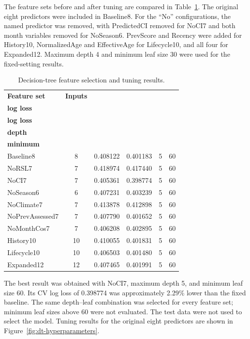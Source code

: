 \documentclass[NewProceedings,letterpaper,NoPageNumbers,NoLineNumbers, DoubleSpace]{ascelike-new}
\begin{document}
The feature sets before and after tuning are compared in Table~\ref{tab:dt-features}. The original eight predictors were included in Baseline8. For the ``No'' configurations, the named predictor was removed, with PredictedCI removed for NoCI7 and both month variables removed for NoSeason6. PrevScore and Recency were added for History10, NormalizedAge and EffectiveAge for Lifecycle10, and all four for Expanded12. Maximum depth 4 and minimum leaf size 30 were used for the fixed-setting results.

\begin{table}[htbp]
\centering
\caption{Decision-tree feature selection and tuning results.}
\label{tab:dt-features}
\small
\renewcommand{\arraystretch}{1.15}
\setlength{\tabcolsep}{4pt}
\begin{tabularx}{\linewidth}{@{}>{\raggedright\arraybackslash}X c r r c c@{}}
\toprule
\textbf{Feature set} &
\textbf{Inputs} &
\shortstack{\textbf{Fixed CV}\\\textbf{log loss}} &
\shortstack{\textbf{Tuned CV}\\\textbf{log loss}} &
\shortstack{\textbf{Best}\\\textbf{depth}} &
\shortstack{\textbf{Best leaf}\\\textbf{minimum}} \\
\midrule
Baseline8       & 8  & 0.408122 & 0.401183 & 5 & 60 \\
NoRSL7          & 7  & 0.418974 & 0.417440 & 5 & 60 \\
NoCI7           & 7  & 0.405361 & 0.398774 & 5 & 60 \\
NoSeason6       & 6  & 0.407231 & 0.403239 & 5 & 60 \\
NoClimate7      & 7  & 0.413878 & 0.412898 & 5 & 60 \\
NoPrevAssessed7 & 7  & 0.407790 & 0.401652 & 5 & 60 \\
NoMonthCos7     & 7  & 0.406208 & 0.402895 & 5 & 60 \\
History10       & 10 & 0.410055 & 0.401831 & 5 & 60 \\
Lifecycle10     & 10 & 0.406503 & 0.401480 & 5 & 60 \\
Expanded12      & 12 & 0.407465 & 0.401991 & 5 & 60 \\
\bottomrule
\end{tabularx}
\end{table}

The best result was obtained with NoCI7, maximum depth 5, and minimum leaf size 60. Its CV log loss of 0.398774 was approximately 2.29\% lower than the fixed baseline. The same depth--leaf combination was selected for every feature set; minimum leaf sizes above 60 were not evaluated. The test data were not used to select the model. Tuning results for the original eight predictors are shown in Figure~\ref{fig:dt-hyperparameters}.
\end{document}
